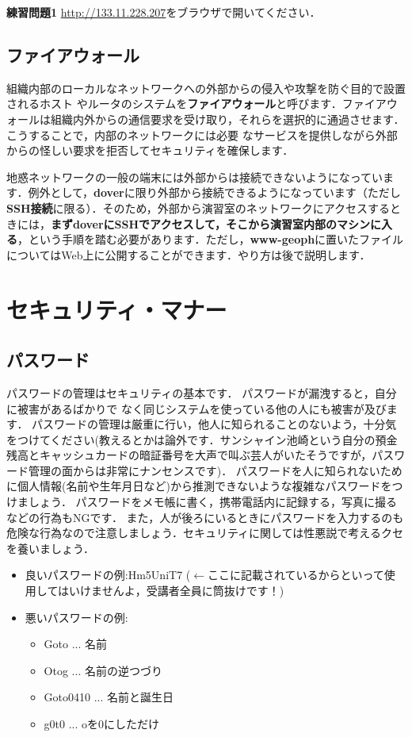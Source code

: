 \documentclass{jarticle}
\begin{document}
\begin{itembox}[l]{\textbf{練習問題1}}
\url{http://133.11.228.207}をブラウザで開いてください．
\end{itembox}

\subsection{ファイアウォール}
組織内部のローカルなネットワークへの外部からの侵入や攻撃を防ぐ目的で設置されるホスト
やルータのシステムを{\bf ファイアウォール}と呼びます．ファイアウォールは組織内外からの通信要求を受け取り，それらを選択的に通過させます．こうすることで，内部のネットワークには必要
なサービスを提供しながら外部からの怪しい要求を拒否してセキュリティを確保します．

地惑ネットワークの一般の端末には外部からは接続できないようになっています．例外として，{\bf dover}に限り外部から接続できるようになっています（ただし{\bf SSH接続}に限る）．そのため，外部から演習室のネットワークにアクセスするときには，{\bf まずdoverにSSHでアクセスして，そこから演習室内部のマシンに入る}，という手順を踏む必要があります．ただし，{\bf www-geoph}に置いたファイルについてはWeb上に公開することができます．やり方は後で説明します．


\section{セキュリティ・マナー}
\subsection{パスワード}
パスワードの管理はセキュリティの基本です．
パスワードが漏洩すると，自分に被害があるばかりで なく同じシステムを使っている他の人にも被害が及びます．
パスワードの管理は厳重に行い，他人に知られることのないよう，十分気をつけてください(教えるとかは論外です．サンシャイン池崎という自分の預金残高とキャッシュカードの暗証番号を大声で叫ぶ芸人がいたそうですが，パスワード管理の面からは非常にナンセンスです)．
パスワードを人に知られないために個人情報(名前や生年月日など)から推測できないような複雑なパスワードをつけましょう．
パスワードをメモ帳に書く，携帯電話内に記録する，写真に撮るなどの行為もNGです．
また，人が後ろにいるときにパスワードを入力するのも危険な行為なので注意しましょう．セキュリティに関しては性悪説で考えるクセを養いましょう．
\begin{itemize}
\item 良いパスワードの例:Hm5UniT7 ($\leftarrow$ここに記載されているからといって使用してはいけませんよ，受講者全員に筒抜けです！)
\item 悪いパスワードの例:
	\begin{itemize}
	\item Goto ... 名前
	\item Otog ... 名前の逆つづり
	\item Goto0410 ... 名前と誕生日
	\item g0t0 ... oを0にしただけ
	\end{itemize}
\end{itemize}
\end{document}

